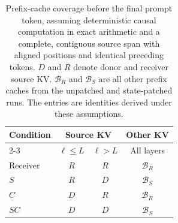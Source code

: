 \begin{table}[t]
\centering
\caption{Prefix-cache coverage before the final prompt token, assuming
deterministic causal computation in exact arithmetic and a complete,
contiguous source span with aligned positions and identical preceding
tokens. $D$ and $R$
denote donor and receiver source KV. $\mathcal B_R$ and $\mathcal B_S$
are all other prefix caches from the unpatched and state-patched runs.
The entries are identities derived under these assumptions.}
\label{tab:cache-coverage}
\small
\renewcommand{\arraystretch}{1.18}
\setlength{\tabcolsep}{5pt}
\begin{tabular}{@{}lccc@{}}
\toprule
Condition & \multicolumn{2}{c}{Source KV} & Other KV \\
\cmidrule(lr){2-3}
 & $\ell\le L$ & $\ell>L$ & All layers \\
\midrule
Receiver & $R$ & $R$ & $\mathcal B_R$ \\
$S$ & $R$ & $D$ & $\mathcal B_S$ \\
$C$ & $D$ & $R$ & $\mathcal B_R$ \\
$SC$ & $D$ & $D$ & $\mathcal B_S$ \\
\bottomrule
\end{tabular}
\end{table}
